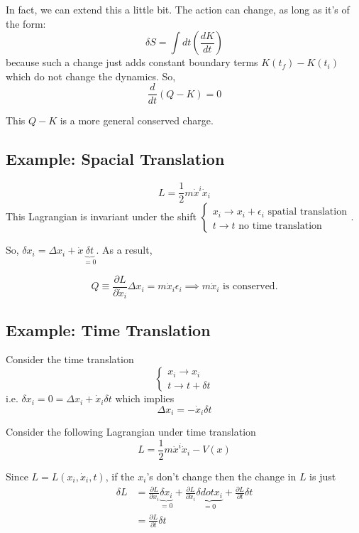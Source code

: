 \documentclass[11pt]{article}
\begin{document}
\vskip 0.5cm 
In fact, we can extend this a little bit. The action can change, as long as it's of the form:
\[ \delta S = \int dt \left( \frac{dK}{dt} \right) \]
because such a change just adds constant boundary terms $K(t_f) - K(t_i)$ which do not change the dynamics. So,
\[ \frac{d}{dt} \left( Q - K \right) = 0 \]

\vskip 0.5cm
This $Q - K$ is a more general conserved charge.

\vskip 0.5cm
\subsection{Example: Spacial Translation}
\[ L = \frac{1}{2} m\dot{x}^i \dot{x}_i \]
This Lagrangian is invariant under the shift $\begin{cases}
  x_i \rightarrow x_i + \epsilon_i \text{  spatial translation} \\
  t \rightarrow t \text{ no time translation}
\end{cases}$. 

So, $\delta x_i = \Delta x_i + \dot{x} \underbrace{\delta t}_{=0}$. As a result,

\[ Q \equiv \frac{\partial L}{\partial \dot{x}_i} \Delta x_i = m\dot{x}_i \epsilon_i \implies m\dot{x}_i \text{ is conserved.}\]

\vskip 0.5cm
\subsection{Example: Time Translation}
Consider the time translation 
\[ \begin{cases}
  x_i \rightarrow x_i \\
  t \rightarrow t + \delta t
\end{cases}  \]
i.e. $\delta x_i = 0 = \Delta x_i + \dot{x}_i \delta t$ which implies 
\[ \Delta x_i = -\dot{x}_i \delta t \]

\vskip 0.5cm
Consider the following Lagrangian under time translation
\[ L = \frac{1}{2}m\dot{x}^i \dot{x}_i - V(x) \]

Since $L = L(x_i, \dot{x}_i, t)$, if the $x_i$'s don't change then the change in $L$ is just 
\begin{align*}
  \delta L &= \frac{\partial L}{\partial x_i} \underbrace{\delta x_i}_{=0} + \frac{\partial L}{\partial \dot{x}_i} \underbrace{\delta dot{x}_i}_{=0} + \frac{\partial L}{\partial t} \delta t \\
  &= \frac{\partial L}{\partial t} \delta t  
\end{align*} 
\end{document}
